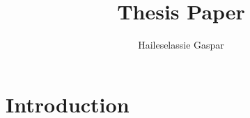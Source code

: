 \documentclass[12pt]{article}
\title{Thesis Paper}
\author{Haileselassie Gaspar}
\begin{document}
\maketitle

\section{Introduction}
\end{document}
